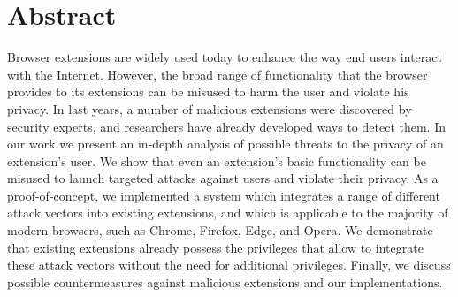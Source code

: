 \documentclass[longdoc,parskip=full,bigchapter,linedtoc,colorback,accentcolor=tud9c,type=bsc]{tudthesis}
\newcommand\blankpage{%
	\afterpage{
	\null
	\thispagestyle{empty}%
	\newpage}}
\begin{document}
	
	\author{Arno Manfred Krause}
	\makethesistitle
	
	\section*{Abstract}
	
	Browser extensions are widely used today to enhance the way end users interact with the Internet. However, the broad range of functionality that the browser provides to its extensions can be misused to harm the user and violate his privacy. In last years, a number of malicious extensions were discovered by security experts, and researchers have already developed ways to detect them. In our work we present an in-depth analysis of possible threats to the privacy of an extension's user. We show that even an extension's basic functionality can be misused to launch targeted attacks against users and violate their privacy. As a proof-of-concept, we implemented a system which integrates a range of different attack vectors into existing extensions, and which is applicable to the majority of modern browsers, such as Chrome, Firefox, Edge, and Opera. We demonstrate that existing extensions already possess the privileges that allow to integrate these attack vectors without the need for additional privileges. Finally, we discuss possible countermeasures against malicious extensions and our implementations.
	\blankpage
	
	\blankpage
	
	\tableofcontents
	\blankpage
	
	
	
	
	
	
	
	
	
	
	
	
	
	
	
	
	
	

	\appendix
	
	
	
\end{document}
